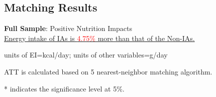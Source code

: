 \documentclass{beamer}	%
\theoremstyle{plain}
\theoremstyle{definition}
\theoremstyle{remark}
\numberwithin{equation}{section}
\begin{document}
\subsection {Matching Results}
\begin{frame}
	\textbf{Full Sample}: Positive Nutrition Impacts \\
	\underline{Energy intake of IAs is \textcolor{red}{4.75\%} more than that of the Non-IAs.} \\
	\centering
	\begin{table}[]
		\caption{Effects of Internet Access on Nutrition Consumption: Full Sample}
		\begin{tablenotes}
			\item \tiny{units of EI=kcal/day; units of other variables=g/day}
			\item \tiny{ATT is calculated based on 5 nearest-neighbor matching algorithm.}
			\item \tiny{* indicates the significance level at 5\%.}
		\end{tablenotes}		
	\end{table}
\end{frame}
\end{document}

